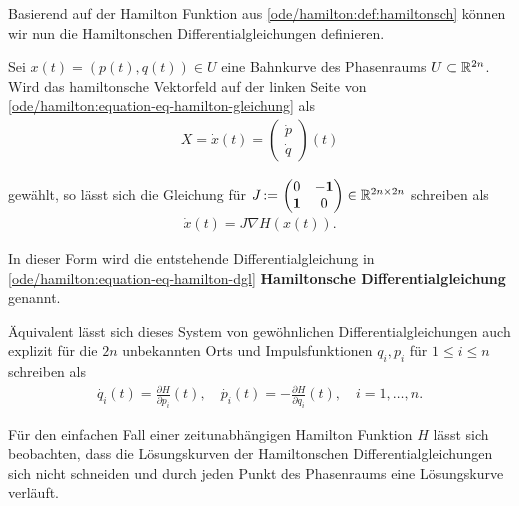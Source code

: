 \par
Basierend auf der Hamilton Funktion aus \cref{ode/hamilton:def:hamiltonsch} können wir nun die Hamiltonschen Differentialgleichungen definieren.
\label{ode/hamilton:definition-2}
\begin{definition}{}{}



\par
Sei \(x(t) = (p(t),q(t)) \in U\) eine Bahnkurve des Phasenraums \(U \subset \mathbb{R}^{2n}\).
Wird das hamiltonsche Vektorfeld auf der linken Seite von \cref{ode/hamilton:equation-eq-hamilton-gleichung} als
\begin{align*}
X = \dot{x}(t) = \begin{pmatrix} \dot{p} \\ \dot{q} \end{pmatrix} (t)
\end{align*}
\par
gewählt, so lässt sich die Gleichung für \(J \, {:=} \, \begin{pmatrix}0 & -\mathbf{1}\\ \mathbf{1} & 0 \end{pmatrix} \in \mathbb{R}^{2n \times 2n}\) schreiben als
\begin{align}\label{equation:ode/hamilton:eq:hamilton_DGL}
\dot{x}(t) = J \nabla H(x(t)).
\end{align}
\par
In dieser Form wird die entstehende Differentialgleichung in \cref{ode/hamilton:equation-eq-hamilton-dgl} \textbf{Hamiltonsche Differentialgleichung} genannt.

\par
Äquivalent lässt sich dieses System von gewöhnlichen Differentialgleichungen auch explizit für die \(2n\) unbekannten Orts  und Impulsfunktionen \(q_i, p_i\) für \(1 \leq i \leq n\) schreiben als
\begin{align*}
\dot{q_i}(t) = \frac{\partial H}{\partial p_i}(t), \quad \dot{p_i}(t) = -\frac{\partial H}{\partial q_i}(t), \quad i=1,\ldots,n.
\end{align*}\end{definition}

\par
Für den einfachen Fall einer zeitunabhängigen Hamilton Funktion \(H\) lässt sich beobachten, dass die Lösungskurven der Hamiltonschen Differentialgleichungen sich nicht schneiden und durch jeden Punkt des Phasenraums eine Lösungskurve verläuft.

